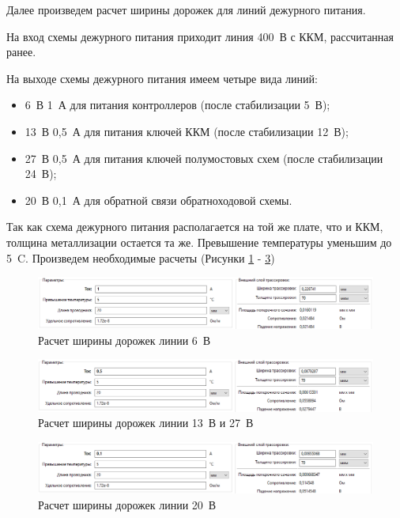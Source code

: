 \documentclass[utf8x, 14pt, oneside, a4paper]{article}
\begin{document}
		Далее произведем расчет ширины дорожек для линий дежурного питания.
		
		На вход схемы дежурного питания приходит линия 400~В с ККМ, рассчитанная ранее. 
		
		На выходе схемы дежурного питания имеем четыре вида линий:
		
		\begin{itemize}
			\item 6~В 1~А для питания контроллеров (после стабилизации 5~В);
			\item 13~В 0,5~А для питания ключей ККМ (после стабилизации 12~В);
			\item 27~В 0,5~А для питания ключей полумостовых схем (после стабилизации 24~В);
			\item 20~В 0,1~А для обратной связи обратноходовой схемы.
		\end{itemize}
	
		Так как схема дежурного питания располагается на той же плате, что и ККМ, толщина металлизации остается та же. Превышение температуры уменьшим до 5~{\textdegree}C. Произведем необходимые расчеты (Рисунки \ref{fig:kicad-calc-trassing-6} - \ref{fig:kicad-calc-trassing-20})
		
		\begin{figure}[H]
			\centering
			\includegraphics[width=1\linewidth]{"Рисунки/KiCad-calc-trassing-6"}
			\caption{Расчет ширины дорожек линии 6~В}
			\label{fig:kicad-calc-trassing-6}
		\end{figure}
	
		\begin{figure}[H]
			\centering
			\includegraphics[width=1\linewidth]{"Рисунки/KiCad-calc-trassing-13"}
			\caption{Расчет ширины дорожек линии 13~В и 27~В}
			\label{fig:kicad-calc-trassing-13}
		\end{figure}
	
		\begin{figure}[H]
			\centering
			\includegraphics[width=1\linewidth]{"Рисунки/KiCad-calc-trassing-20"}
			\caption{Расчет ширины дорожек линии 20~В}
			\label{fig:kicad-calc-trassing-20}
		\end{figure}
	
\end{document}

